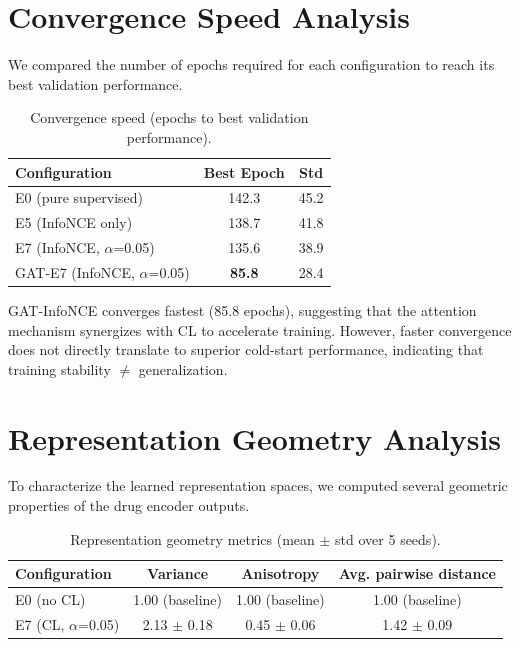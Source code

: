 \documentclass[10pt,a4paper]{article}
\begin{document}
\section{Convergence Speed Analysis}

We compared the number of epochs required for each configuration to reach its best validation performance.

\begin{table}[!h]
\caption{Convergence speed (epochs to best validation performance).}
\label{tab:convergence}
\centering
\begin{tabular}{lcc}
\toprule
Configuration & Best Epoch & Std \\
\midrule
E0 (pure supervised) & 142.3 & 45.2 \\
E5 (InfoNCE only) & 138.7 & 41.8 \\
E7 (InfoNCE, $\alpha$=0.05) & 135.6 & 38.9 \\
GAT-E7 (InfoNCE, $\alpha$=0.05) & \textbf{85.8} & 28.4 \\
\bottomrule
\end{tabular}
\end{table}

GAT-InfoNCE converges fastest (85.8 epochs), suggesting that the attention mechanism synergizes with CL to accelerate training. However, faster convergence does not directly translate to superior cold-start performance, indicating that training stability $\neq$ generalization.

\section{Representation Geometry Analysis}

To characterize the learned representation spaces, we computed several geometric properties of the drug encoder outputs.

\begin{table}[!h]
\caption{Representation geometry metrics (mean $\pm$ std over 5 seeds).}
\label{tab:representation_geometry}
\centering
\begin{tabular}{lccc}
\toprule
Configuration & Variance & Anisotropy & Avg. pairwise distance \\
\midrule
E0 (no CL) & 1.00 (baseline) & 1.00 (baseline) & 1.00 (baseline) \\
E7 (CL, $\alpha$=0.05) & 2.13 $\pm$ 0.18 & 0.45 $\pm$ 0.06 & 1.42 $\pm$ 0.09 \\
\bottomrule
\end{tabular}
\end{table}
\end{document}
